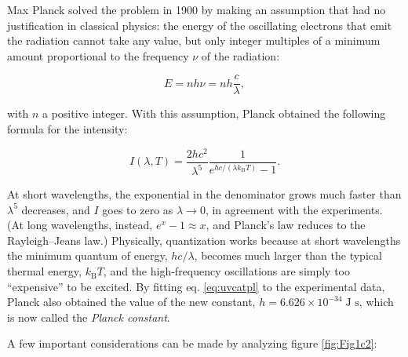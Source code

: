 \documentclass[
  english,
  9pt,
]{extbook}
\theoremstyle{definition}
\theoremstyle{definition}
\theoremstyle{definition}
\theoremstyle{definition}
\theoremstyle{remark}
\begin{document}
Max Planck solved the problem in 1900 by making an assumption that had no justification in classical physics: the energy of the oscillating electrons that emit the radiation cannot take any value, but only integer multiples of a minimum amount proportional to the frequency \(\nu\) of the radiation:

\begin{equation}
E = n h \nu = n h \frac{c}{\lambda},
\label{eq:uvcat}
\end{equation}

with \(n\) a positive integer. With this assumption, Planck obtained the following formula for the intensity:

\begin{equation}
I(\lambda ,T)={\frac {2hc^{2}}{\lambda ^{5}}}{\frac {1}{e^{hc/(\lambda k_{\mathrm {B} }T)}-1}}.
\label{eq:uvcatpl}
\end{equation}

At short wavelengths, the exponential in the denominator grows much faster than \(\lambda^5\) decreases, and \(I\) goes to zero as \(\lambda \rightarrow 0\), in agreement with the experiments. (At long wavelengths, instead, \(e^{x}-1\approx x\), and Planck's law reduces to the Rayleigh--Jeans law.) Physically, quantization works because at short wavelengths the minimum quantum of energy, \(hc/\lambda\), becomes much larger than the typical thermal energy, \(k_{\mathrm{B}}T\), and the high-frequency oscillations are simply too ``expensive'' to be excited. By fitting eq. \eqref{eq:uvcatpl} to the experimental data, Planck also obtained the value of the new constant, \(h = 6.626 \times 10^{-34} \; \text{J s}\), which is now called the \emph{Planck constant}.

A few important considerations can be made by analyzing figure \ref{fig:Fig1c2}:
\end{document}
